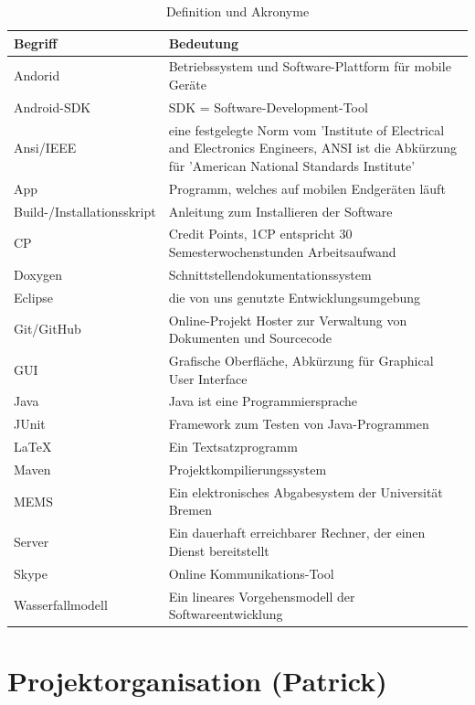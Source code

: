 \documentclass[fontsize=12pt,paper=a4,twoside]{scrartcl}
\begin{document}
\begin{table}[!h]
\caption{Definition und Akronyme}
\centering
\begin{tabular}{p{7cm}|p{7cm}}
\hline Begriff & Bedeutung\\ \hline
\hline Andorid & Betriebssystem und Software-Plattform für mobile Geräte\\
\hline Android-SDK & SDK = Software-Development-Tool\\
\hline Ansi/IEEE & eine festgelegte Norm vom 'Institute of Electrical and Electronics Engineers, ANSI ist die Abkürzung für 'American National Standards Institute'\\
\hline App & Programm, welches auf mobilen Endgeräten läuft\\
\hline Build-/Installationsskript & Anleitung zum Installieren der Software\\
\hline CP & Credit Points, 1CP entspricht 30 Semesterwochenstunden Arbeitsaufwand\\
\hline Doxygen & Schnittstellendokumentationssystem\\
\hline Eclipse & die von uns genutzte Entwicklungsumgebung\\
\hline Git/GitHub & Online-Projekt Hoster zur Verwaltung von Dokumenten und Sourcecode\\
\hline GUI & Grafische Oberfläche, Abkürzung für Graphical User Interface\\
\hline Java & Java ist eine Programmiersprache\\
\hline JUnit & Framework zum Testen von Java-Programmen\\
\hline \LaTeX & Ein Textsatzprogramm\\
\hline Maven & Projektkompilierungssystem\\
\hline MEMS & Ein elektronisches Abgabesystem der Universität Bremen\\
\hline Server & Ein dauerhaft erreichbarer Rechner, der einen Dienst bereitstellt\\
\hline Skype & Online Kommunikations-Tool\\
\hline Wasserfallmodell & Ein lineares Vorgehensmodell der Softwareentwicklung\\ 
\hline
\end{tabular}
\end{table}

\newpage

\section{Projektorganisation (Patrick)}
\end{document}
